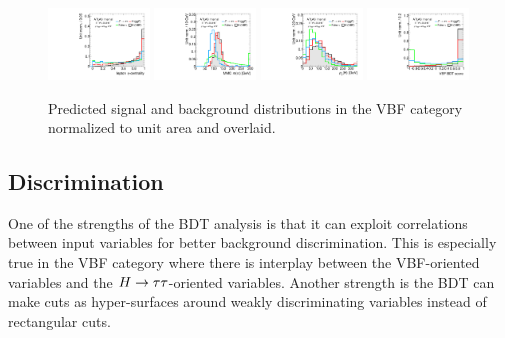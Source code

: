 \begin{figure}[tp]
  \includegraphics[width=0.24\textwidth]{figures/overlaid/vbf/lep-eta-centrality}
  \includegraphics[width=0.24\textwidth]{figures/overlaid/vbf/mMMC}
  \includegraphics[width=0.24\textwidth]{figures/overlaid/vbf/H-pt-hi}
  \includegraphics[width=0.24\textwidth]{figures/overlaid/vbf/BDTEve-VBF} \\
  \caption{Predicted signal and background distributions in the VBF category normalized to unit area and overlaid.}
  \label{fig:strategy-overlaid-vbf-2}
\end{figure}
\clearpage

\subsection{Discrimination}
\label{sec:strategy-mva-correlations}

One of the strengths of the BDT analysis is that it can exploit correlations between input variables for better background discrimination. This is especially true in the VBF category where there is interplay between the VBF-oriented variables and the $H\rightarrow\tau\tau$-oriented variables. Another strength is the BDT can make cuts as hyper-surfaces around weakly discriminating variables instead of rectangular cuts.


